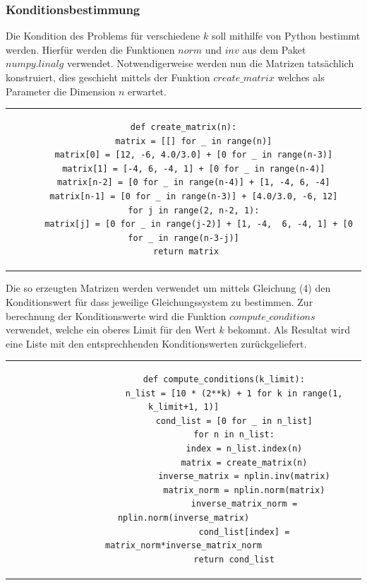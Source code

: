 \documentclass[12pt,titlepage]{article}
\begin{document}
			\subsubsection{Konditionsbestimmung}
				Die Kondition des Problems für verschiedene $k$ soll mithilfe von Python bestimmt werden. Hierfür werden die Funktionen $norm$ und $inv$ aus dem Paket $numpy.linalg$ verwendet.
				Notwendigerweise werden nun die Matrizen tatsächlich konstruiert, dies geschieht mittels der Funktion $create\_matrix$ welches als Parameter die Dimension $n$ erwartet.\newline
				\newline
				\begin{tabular}{c}
				\begin{lstlisting}
def create_matrix(n):
   	matrix = [[] for _ in range(n)]
    matrix[0] = [12, -6, 4.0/3.0] + [0 for _ in range(n-3)]
    matrix[1] = [-4, 6, -4, 1] + [0 for _ in range(n-4)]
    matrix[n-2] = [0 for _ in range(n-4)] + [1, -4, 6, -4]
    matrix[n-1] = [0 for _ in range(n-3)] + [4.0/3.0, -6, 12]
    for j in range(2, n-2, 1):
      matrix[j] = [0 for _ in range(j-2)] + [1, -4,  6, -4, 1] + [0 for _ in range(n-3-j)]
    return matrix	
	 			\end{lstlisting}
				\end{tabular}
				\newline \newline
				Die so erzeugten Matrizen werden verwendet um mittels Gleichung (4) den Konditionswert für dass jeweilige Gleichungssystem zu bestimmen.
				Zur berechnung der Konditionswerte wird die Funktion $compute\_conditions$ verwendet, welche ein oberes Limit für den Wert $k$ bekommt.
				Als Resultat wird eine Liste mit den entsprechhenden Konditionswerten zurückgeliefert. \newline \newline
				\begin{tabular}{c}
				\begin{lstlisting}
				def compute_conditions(k_limit):
    				n_list = [10 * (2**k) + 1 for k in range(1, k_limit+1, 1)]
    				cond_list = [0 for _ in n_list]
    				for n in n_list:
        				index = n_list.index(n)
       					matrix = create_matrix(n)
        				inverse_matrix = nplin.inv(matrix)
        				matrix_norm = nplin.norm(matrix)
        				inverse_matrix_norm = nplin.norm(inverse_matrix)
        				cond_list[index] = matrix_norm*inverse_matrix_norm
    				return cond_list
				\end{lstlisting}
				\end{tabular}
\end{document}

